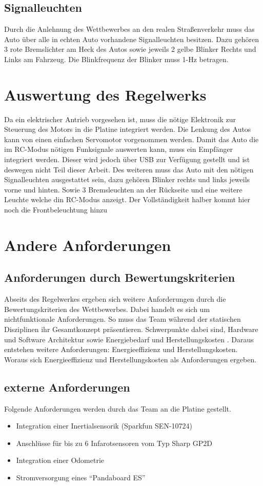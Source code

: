 \subsection{Signalleuchten}
Durch die Anlehnung des Wettbewerbes an den realen Straßenverkehr muss das Auto über alle in echten Auto vorhandene Signalleuchten besitzen. 
Dazu gehören 3 rote Bremslichter am Heck des Autos sowie jeweils 2 gelbe Blinker Rechts und Links am Fahrzeug.  Die Blinkfrequenz der Blinker muss
1-Hz betragen.

\section{Auswertung des Regelwerks}
Da ein elektrischer Antrieb vorgesehen ist, muss die nötige Elektronik zur Steuerung des Motors in die Platine integriert werden.
Die Lenkung des Autos kann von einen einfachen Servomotor vorgenommen werden. 
Damit das Auto die im RC-Modus nötigen Funksignale auswerten kann, muss ein Empfänger integriert werden. Dieser wird jedoch über USB zur Verfügung gestellt und ist deswegen nicht Teil dieser Arbeit.
Des weiteren muss das Auto mit den nötigen Signalleuchten ausgestattet sein, dazu gehören Blinker rechts und links jeweils vorne und hinten.
Sowie 3 Bremsleuchten an der Rückseite und eine weitere Leuchte welche din RC-Modus anzeigt. Der Vollständigkeit halber kommt hier noch die
Frontbeleuchtung hinzu


\section{Andere Anforderungen}
\subsection{Anforderungen durch Bewertungskriterien}
Abseits des Regelwerkes ergeben sich weitere Anforderungen durch die Bewertungskriterien des Wettbewerbes. Dabei handelt es sich um nichtfunktionale Anforderungen.
So muss das Team während der statischen Disziplinen ihr Gesamtkonzept präsentieren. Schwerpunkte dabei sind, Hardware und Software Architektur sowie Energiebedarf und 
Herstellungskosten \cite{website-carolo-cup-regelwerk}. Daraus entstehen weitere Anforderungen: Energieeffizienz und Herstellungskosten. \\

Woraus sich Energieeffizienz und Herstellungskosten als Anforderungen ergeben.

\subsection{externe Anforderungen}
Folgende Anforderungen werden durch das Team an die Platine gestellt.
\begin{itemize}
 \item Integration einer Inertialsensorik (Sparkfun SEN-10724)
 \item Anschlüsse für bis zu 6 Infarotsensoren vom Typ Sharp GP2D
 \item Integration einer Odometrie
 \item Stromversorgung eines ``Pandaboard ES'' 
\end{itemize}

